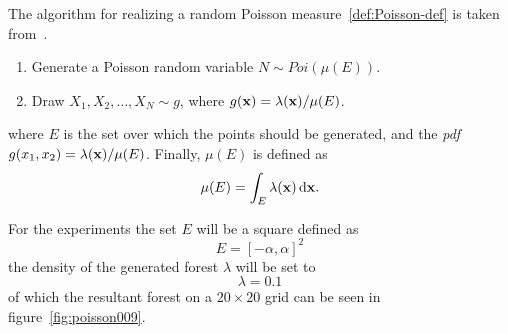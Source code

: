 The algorithm for realizing a random Poisson measure~\cref{def:Poisson-def} is
taken from~\cite[Definition~1.1.1][34]{Kroese_2014}.

\begin{definition}
  \label{def:Poisson-def}
  \begin{enumerate}
  \item Generate a Poisson random variable \(N \sim Poi(\mu(E))\).
  \item Draw \(X_1,X_2,\ldots,X_N \sim g\), where \(g(\mathbf{x}) = \lambda(\mathbf{x})/ \mu(E)\).
  \end{enumerate}
\end{definition}
where \(E\) is the set over which the points should be generated, and the
\textit{pdf} \(g(x_1, x_2) = \lambda(\mathbf{x})/\mu(E)\). Finally, \(\mu(E)\) is
defined as
\[
  \mu(E) = \int_{E} \lambda(\mathbf{x})\, \mathrm{d} \mathbf{x}.
\]

For the experiments the set \(E\) will be a square defined as
\[
  E = {[-\alpha, \alpha]}^2
\]
the density of the generated forest \(\lambda\) will be set to
\[
  \lambda = 0.1
\]
of which the resultant forest on a \(20 \times 20\) grid can be seen in
figure~\cref{fig:poisson009}.

